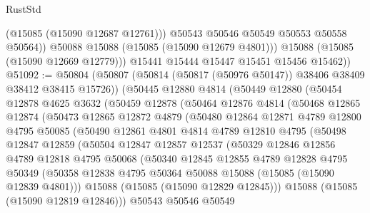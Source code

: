\begin{lexlean}{RustStd}
\begin{coremodule}
                  (@15085 (@15090 @12687 @12761)))
                @50543
                @50546
                @50549
                @50553
                @50558
                @50564))
            @50088
            @15088
            (@15085 (@15090 @12679 @4801)))
          @15088
          (@15085 (@15090 @12669 @12779)))
        @15441
        @15444
        @15447
        @15451
        @15456
        @15462))
@51092 := @50804
    (@50807 (@50814 (@50817 (@50976 @50147)) @38406 @38409 @38412 @38415 @15726))
    (@50445
      @12880
      @4814
      (@50449
        @12880
        (@50454
          @12878
          @4625
          @3632
          (@50459
            @12878
            (@50464
              @12876
              @4814
              (@50468
                @12865
                @12874
                (@50473
                  @12865
                  @12872
                  @4879
                  (@50480
                    @12864
                    @12871
                    @4789
                    @12800
                    @4795
                    @50085
                    (@50490
                      @12861
                      @4801
                      @4814
                      @4789
                      @12810
                      @4795
                      (@50498
                        @12847
                        @12859
                        (@50504
                          @12847
                          @12857
                          @12537
                          (@50329
                            @12846
                            @12856
                            @4789
                            @12818
                            @4795
                            @50068
                            (@50340
                              @12845
                              @12855
                              @4789
                              @12828
                              @4795
                              @50349
                              (@50358
                                @12838
                                @4795
                                @50364
                                @50088
                                @15088
                                (@15085 (@15090 @12839 @4801)))
                              @15088
                              (@15085 (@15090 @12829 @12845)))
                            @15088
                            (@15085 (@15090 @12819 @12846)))
                          @50543
                          @50546
                          @50549

\end{coremodule}
\end{lexlean}
